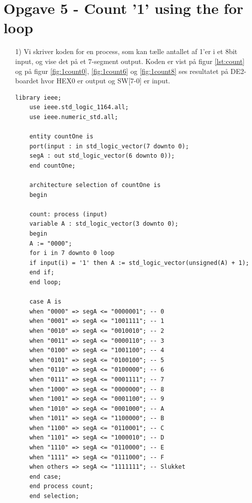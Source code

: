 \section{Opgave 5 - Count '1' using the for loop}
\begin{enumerate}
	\item[1)]
	Vi skriver koden for en process, som kan tælle antallet af 1'er i et 8bit input, og vise det på et 7-segment output. Koden er vist på figur \ref{lst:count} og på figur \ref{fig:1count0}, \ref{fig:1count6} og \ref{fig:1count8}  ses resultatet på DE2-boardet hvor HEX0 er output og SW[7-0] er input.\\
	\begin{lstlisting}[caption={Behavioral style kode for en '1'-counter},label={lst:count}]
	library ieee;
	use ieee.std_logic_1164.all;
	use ieee.numeric_std.all;
	
	entity countOne is
	port(input : in std_logic_vector(7 downto 0);
	segA : out std_logic_vector(6 downto 0));
	end countOne;
	
	architecture selection of countOne is
	begin
	
	count: process (input)
	variable A : std_logic_vector(3 downto 0);
	begin
	A := "0000";
	for i in 7 downto 0 loop
	if input(i) = '1' then A := std_logic_vector(unsigned(A) + 1);
	end if;
	end loop;
	
	case A is
	when "0000" => segA <= "0000001"; -- 0
	when "0001" => segA <= "1001111"; -- 1
	when "0010" => segA <= "0010010"; -- 2
	when "0011" => segA <= "0000110"; -- 3
	when "0100" => segA <= "1001100"; -- 4
	when "0101" => segA <= "0100100"; -- 5
	when "0110" => segA <= "0100000"; -- 6
	when "0111" => segA <= "0001111"; -- 7
	when "1000" => segA <= "0000000"; -- 8
	when "1001" => segA <= "0001100"; -- 9
	when "1010" => segA <= "0001000"; -- A
	when "1011" => segA <= "1100000"; -- B
	when "1100" => segA <= "0110001"; -- C
	when "1101" => segA <= "1000010"; -- D
	when "1110" => segA <= "0110000"; -- E
	when "1111" => segA <= "0111000"; -- F
	when others => segA <= "1111111"; -- Slukket
	end case;
	end process count;
	end selection;
	
	\end{lstlisting}
	

\end{enumerate}
